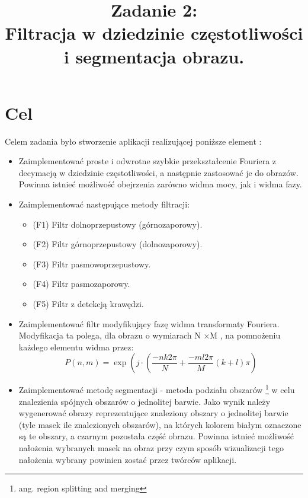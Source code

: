 \documentclass{classrep}
\author{
  \studentinfo{Paweł Musiał}{178726} \and
  \studentinfo{Łukasz Michalski}{178724}
}
\title{Zadanie 2:\\  \textbf {Filtracja w dziedzinie częstotliwości i segmentacja obrazu.}}
\begin{document}
\maketitle

\addtocounter{footnote}{1}

\tableofcontents

\section{Cel}

Celem zadania było stworzenie aplikacji realizującej poniższe element :
\begin{itemize}
\item Zaimplementować proste i odwrotne szybkie przekształcenie Fouriera z decymacją w dziedzinie częstotliwości, a następnie zastosować je do obrazów. Powinna istnieć możliwość obejrzenia zarówno widma mocy, jak i widma fazy.
\item Zaimplementować następujące metody filtracji:
	\begin{itemize}
	\item	(F1) Filtr dolnoprzepustowy (górnozaporowy).
	\item	(F2) Filtr górnoprzepustowy (dolnozaporowy).
	\item	(F3) Filtr pasmowoprzepustowy.
	\item	(F4) Filtr pasmozaporowy.
	\item	(F5) Filtr z detekcją krawędzi.
	\end{itemize}
\item Zaimplementować filtr modyfikujący fazę widma transformaty Fouriera. Modyfikacja ta polega, dla obrazu o wymiarach N ×M , na pomnożeniu każdego elementu widma przez:
\begin{equation}
P(n,m) = \exp { \left( j \cdot \left( \frac{-n k 2 \pi}{N} + \frac{-m l 2 \pi }{M} \left( k + l  \right) \pi \right) }
\end{equation}
\item Zaimplementować metodę segmentacji - metoda podziału obszarów \footnote{ang. region splitting and merging}  w celu znalezienia spójnych obszarów o jednolitej barwie. Jako wynik należy wygenerować obrazy reprezentujące znaleziony obszary o jednolitej barwie (tyle masek ile znalezionych obszarów), na których kolorem białym oznaczone są te obszary, a czarnym pozostała część obrazu. Powinna istnieć możliwość nałożenia wybranych masek na obraz przy czym sposób wizualizacji tego nałożenia wybrany powinien zostać przez twórców aplikacji.


\end{itemize}
\end{document}
